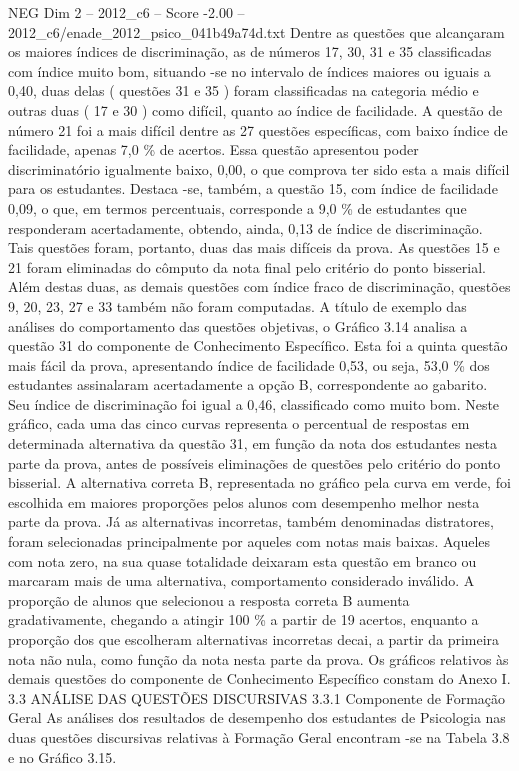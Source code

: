 \begin{textsample}{NEG Dim 2 – 2012\_c6 – Score -2.00 – 2012\_c6/enade\_2012\_psico\_041b49a74d.txt}
Dentre as questões que alcançaram os maiores índices de discriminação, as de números 17, 30, 31 e 35 classificadas com índice muito bom, situando -se no intervalo de índices maiores ou iguais a 0,40, duas delas ( questões 31 e 35 ) foram classificadas na categoria médio e outras duas ( 17 e 30 ) como difícil, quanto ao índice de facilidade.
A questão de número 21 foi a mais difícil dentre as 27 questões específicas, com baixo índice de facilidade, apenas 7,0 \% de acertos.
Essa questão apresentou poder discriminatório igualmente baixo, 0,00, o que comprova ter sido esta a mais difícil para os estudantes.
Destaca -se, também, a questão 15, com índice de facilidade 0,09, o que, em termos percentuais, corresponde a 9,0 \% de estudantes que responderam acertadamente, obtendo, ainda, 0,13 de índice de discriminação.
Tais questões foram, portanto, duas das mais difíceis da prova.
As questões 15 e 21 foram eliminadas do cômputo da nota final pelo critério do ponto bisserial.
Além destas duas, as demais questões com índice fraco de discriminação, questões 9, 20, 23, 27 e 33 também não foram computadas.
A título de exemplo das análises do comportamento das questões objetivas, o Gráfico 3.14 analisa a questão 31 do componente de Conhecimento Específico.
Esta foi a quinta questão mais fácil da prova, apresentando índice de facilidade 0,53, ou seja, 53,0 \% dos estudantes assinalaram acertadamente a opção B, correspondente ao gabarito.
Seu índice de discriminação foi igual a 0,46, classificado como muito bom.
Neste gráfico, cada uma das cinco curvas representa o percentual de respostas em determinada alternativa da questão 31, em função da nota dos estudantes nesta parte da prova, antes de possíveis eliminações de questões pelo critério do ponto bisserial.
A alternativa correta B, representada no gráfico pela curva em verde, foi escolhida em maiores proporções pelos alunos com desempenho melhor nesta parte da prova.
Já as alternativas incorretas, também denominadas distratores, foram selecionadas principalmente por aqueles com notas mais baixas.
Aqueles com nota zero, na sua quase totalidade deixaram esta questão em branco ou marcaram mais de uma alternativa, comportamento considerado inválido.
A proporção de alunos que selecionou a resposta correta B aumenta gradativamente, chegando a atingir 100 \% a partir de 19 acertos, enquanto a proporção dos que escolheram alternativas incorretas decai, a partir da primeira nota não nula, como função da nota nesta parte da prova.
Os gráficos relativos às demais questões do componente de Conhecimento Específico constam do Anexo I. 3.3 ANÁLISE DAS QUESTÕES DISCURSIVAS 3.3.1 Componente de Formação Geral As análises dos resultados de desempenho dos estudantes de Psicologia nas duas questões discursivas relativas à Formação Geral encontram -se na Tabela 3.8 e no Gráfico 3.15.

\end{textsample}
